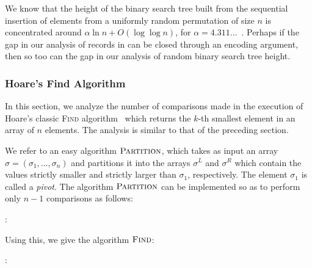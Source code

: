 \documentclass{patmorin}
\begin{document}
\begin{rem}
  We know that the height of the binary search tree built from the
  sequential insertion of elements from a uniformly random permutation
  of size $n$ is concentrated around $\alpha \ln n + O(\log \log n)$,
  for $\alpha = 4.311...$~\cite{reed:height}. Perhaps if the gap in
  our analysis of records in  can be closed through an
  encoding argument, then so too can the gap in our analysis of random
  binary search tree height.
\end{rem}

\subsubsection{Hoare's Find Algorithm}

In this section, we analyze the number of comparisons made in the
execution of Hoare's classic \textsc{Find} algorithm~\cite{hoare:find}
which returns the $k$-th smallest element in an array of $n$
elements. The analysis is similar to that of the preceding section.

We refer to an easy algorithm $\textsc{Partition}$, which takes as
input an array $\sigma = (\sigma_1, \dots, \sigma_n)$ and partitions
it into the arrays $\sigma^L$ and $\sigma^R$ which contain the values
strictly smaller and strictly larger than $\sigma_1$,
respectively. The element $\sigma_1$ is called a \emph{pivot}. The
algorithm $\textsc{Partition}$ can be implemented so as to perform
only $n - 1$ comparisons as follows:

:
\begin{algorithmic}[1]
    \ELSE
    \ENDIF
  \ENDFOR
\end{algorithmic}

Using this, we give the algorithm $\textsc{Find}$:

:
\begin{algorithmic}[1]
  \ENDIF
\end{algorithmic}
\end{document}

